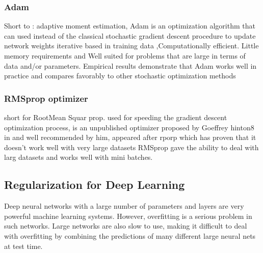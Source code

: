 \subsubsection{Adam}
Short to : adaptive moment estimation, Adam is an optimization algorithm that can
used instead of the classical stochastic gradient descent procedure to update network
weights iterative based in training data
\cite{art22} ,Computationally efficient. Little memory
requirements and Well suited for problems that are large in terms of data and/or parameters.
Empirical results demonstrate that Adam works well in practice and compares
favorably to other stochastic optimization methods
\cite{art22}
\subsubsection{RMSprop optimizer}
short for RootMean Squar prop. used for speeding the gradient descent optimization
process, is an unpublished optimizer proposed by Goeffrey hinton8 in \cite{c1} and well
recommended by him, appeared after rporp which has proven that it doesn’t work well with very large datasets \cite{c1}  RMSprop gave the ability to deal with larg datasets and works well with mini batches.
\subsection{Regularization for Deep Learning}
Deep neural networks with a large number of parameters and layers are very powerful
machine learning systems. However, overfitting is a serious problem in such networks.
Large networks are also slow to use, making it difficult to deal with overfitting by
combining the predictions of many different large neural nets at test time.
